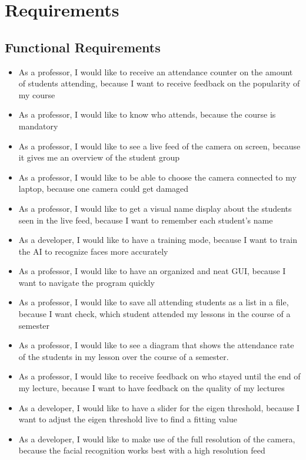 \documentclass[12pt, a4paper]{article}
\begin{document}
\newpage



\section{Requirements}
\subsection{Functional Requirements}
\begin{itemize}
\item As a professor, I would like to receive an attendance counter on the amount of students attending, because I want to receive feedback on the popularity of my course
\item As a professor, I would like to know who attends, because the course is mandatory
\item As a professor, I would like to see a live feed of the camera on screen, because it gives me an overview of the student group
\item As a professor, I would like to be able to choose the camera connected to my laptop, because one camera could get damaged
\item As a professor, I would like to get a visual name display about the students seen in the live feed, because I want to remember each student's name
\item As a developer, I would like to have a training mode, because I want to train the AI to recognize faces more accurately
\item As a professor, I would like to have an organized and neat GUI, because I want to navigate the program quickly
\item As a professor, I would like to save all attending students as a list in a file, because I want check, which student attended my lessons in the course of a semester
\item As a professor, I would like to see a diagram that shows the attendance rate of the students in my lesson over the course of a semester.
\item As a professor, I would like to receive feedback on who stayed until the end of my lecture, because I want to have feedback on the quality of my lectures
\item As a developer, I would like to have a slider for the eigen threshold, because I want to adjust the eigen threshold live to find a fitting value
\item As a developer, I would like to make use of the full resolution of the camera, because the facial recognition works best with a high resolution feed
\end{itemize}
\end{document}

